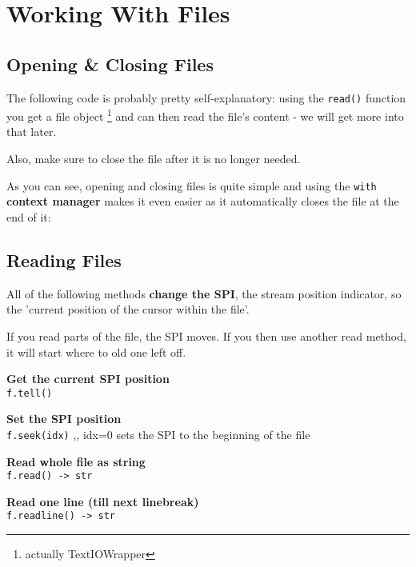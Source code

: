 \section{Working With Files}

\subsection{Opening \& Closing Files}
The following code is probably pretty self-explanatory:
using the \texttt{read()} function you get a file object
\footnote{actually TextIOWrapper} and can then read the file's content
- we will get more into that later.

Also, make sure to close the file after it is no longer needed.


As you can see, opening and closing files is quite simple and using the
\texttt{with} \textbf{context manager} makes it even easier as it automatically
closes the file at the end of it:



\subsection{Reading Files}

All of the following methods \textbf{change the SPI}, the stream position indicator, so the
'current position of the cursor within the file'.

If you read parts of the file, the SPI moves. If you then use another read method, it will
start where to old one left off.

\textbf{Get the current SPI position} \\
\texttt{f.tell()}

\textbf{Set the SPI position} \\
\texttt{f.seek(idx)} \sep{,}
idx=0 sets the SPI to the beginning of the file

\textbf{Read whole file as string} \\
\texttt{f.read() -> str}

\textbf{Read one line (till next linebreak)} \\
\texttt{f.readline() -> str}

